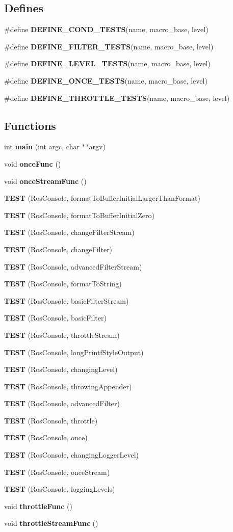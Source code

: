 \subsection*{Defines}
\begin{DoxyCompactItemize}
\item 
\#define {\bf DEFINE\_\-COND\_\-TESTS}(name, macro\_\-base, level)
\item 
\#define {\bf DEFINE\_\-FILTER\_\-TESTS}(name, macro\_\-base, level)
\item 
\#define {\bf DEFINE\_\-LEVEL\_\-TESTS}(name, macro\_\-base, level)
\item 
\#define {\bf DEFINE\_\-ONCE\_\-TESTS}(name, macro\_\-base, level)
\item 
\#define {\bf DEFINE\_\-THROTTLE\_\-TESTS}(name, macro\_\-base, level)
\end{DoxyCompactItemize}
\subsection*{Functions}
\begin{DoxyCompactItemize}
\item 
int {\bf main} (int argc, char $\ast$$\ast$argv)
\item 
void {\bf onceFunc} ()
\item 
void {\bf onceStreamFunc} ()
\item 
{\bf TEST} (RosConsole, formatToBufferInitialLargerThanFormat)
\item 
{\bf TEST} (RosConsole, formatToBufferInitialZero)
\item 
{\bf TEST} (RosConsole, changeFilterStream)
\item 
{\bf TEST} (RosConsole, changeFilter)
\item 
{\bf TEST} (RosConsole, advancedFilterStream)
\item 
{\bf TEST} (RosConsole, formatToString)
\item 
{\bf TEST} (RosConsole, basicFilterStream)
\item 
{\bf TEST} (RosConsole, basicFilter)
\item 
{\bf TEST} (RosConsole, throttleStream)
\item 
{\bf TEST} (RosConsole, longPrintfStyleOutput)
\item 
{\bf TEST} (RosConsole, changingLevel)
\item 
{\bf TEST} (RosConsole, throwingAppender)
\item 
{\bf TEST} (RosConsole, advancedFilter)
\item 
{\bf TEST} (RosConsole, throttle)
\item 
{\bf TEST} (RosConsole, once)
\item 
{\bf TEST} (RosConsole, changingLoggerLevel)
\item 
{\bf TEST} (RosConsole, onceStream)
\item 
{\bf TEST} (RosConsole, loggingLevels)
\item 
void {\bf throttleFunc} ()
\item 
void {\bf throttleStreamFunc} ()
\end{DoxyCompactItemize}
